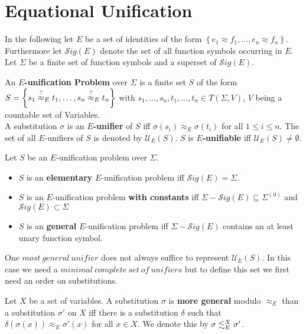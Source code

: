 \section{Equational Unification}
In the following let $E$ be a set of identities of the form $\left\lbrace  e_1\approx f_1,\dots,e_n\approx f_n \right\rbrace$. Furthermore let $\mathcal{S}ig(E)$ denote the set of all function symbols occurring in $E$. Let $\Sigma$ be a finite set of function symbols and a superset of $\mathcal{S}ig(E)$.
\begin{definition}
An \textbf{$E$-unification Problem} over $\Sigma$ is a finite set $S$ of the form $S=\left\lbrace s_1\stackrel{?}{\approx}_{E} t_1,\dots,s_n\stackrel{?}{\approx}_{E} t_n\right\rbrace $ with $s_1,\dots,s_n,t_1,\dots,t_n \in T(\Sigma,V)$, $V$ being a countable set of Variables.\\
A substitution $\sigma$ is an \textbf{$E$-unifier} of $S$ iff $ \sigma(s_i)\approx_E \sigma(t_i)$ for all $1\leq i \leq n$.
The set of all $E$-unifiers of $S$ is denoted by $\mathcal{U}_E(S)$. $S$ is \textbf{$E$-unifiable} iff $\mathcal{U}_E(S)\neq \emptyset$.
\end{definition}
\begin{definition}
Let $S$ be an $E$-unification problem over $\Sigma$.
\begin{itemize}
\item $S$ is an \textbf{elementary} $E$-unification problem iff $\mathcal{S}ig(E)=\Sigma$.
\item $S$ is an $E$-unification problem \textbf{with constants} iff $\Sigma-\mathcal{S}ig(E)\subseteq\Sigma^{(0)}$ and $\mathcal{S}ig(E)\subset\Sigma$
\item $S$ is an \textbf{general} $E$-unification problem iff $\Sigma-\mathcal{S}ig(E)$ contains an at least unary function symbol.
\end{itemize}
\end{definition}
One $most\ general\ unifier$ does not always suffice to represent $\mathcal{U}_E(S)$. In this case we need a $minimal\ complete\ set\ of\ unifiers$ but to define this set we first need an order on substitutions.
\begin{definition}
Let $X$ be a set of variables. A substitution $\sigma$ is \textbf{more general} modulo $\approx_E$ than a substitution $\sigma'$ on $X$ iff there is a substitution $\delta$ such that $\delta(\sigma(x))\approx_E\sigma'(x)$ for all $x \in X$. We denote this by $\sigma\lesssim^X_E\sigma'$.
\end{definition}
